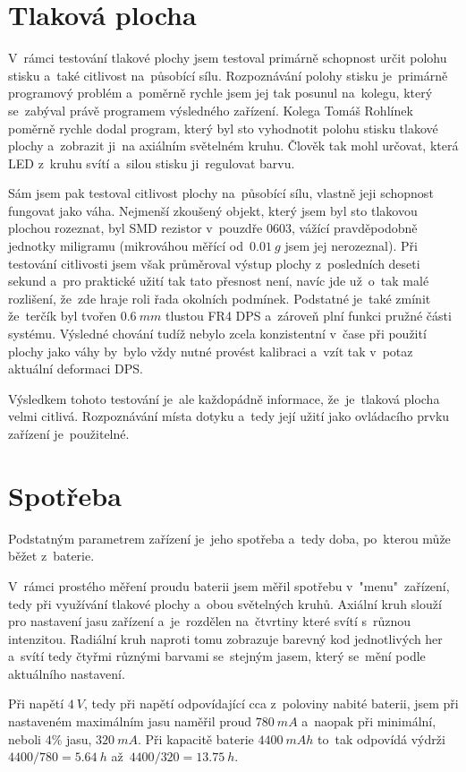 \section{Tlaková plocha \label{popisTlakovky3}}
V~rámci testování tlakové plochy jsem testoval primárně schopnost určit polohu stisku a~také citlivost na~působící sílu.
Rozpoznávání polohy stisku je~primárně programový problém a~poměrně rychle jsem jej tak posunul na~kolegu, který se~zabýval právě programem výsledného zařízení.
Kolega Tomáš Rohlínek poměrně rychle dodal program, který byl sto vyhodnotit polohu stisku tlakové plochy a~zobrazit ji~na axiálním světelném kruhu.
Člověk tak mohl určovat, která LED z~kruhu svítí a~silou stisku ji~regulovat barvu.

Sám jsem pak testoval citlivost plochy na~působící sílu, vlastně jeji schopnost fungovat jako váha.
Nejmenší zkoušený objekt, který jsem byl sto tlakovou plochou rozeznat, byl SMD rezistor v~pouzdře 0603, vážící pravděpodobně jednotky miligramu (mikrováhou měřící od~\(0.01~g\) jsem jej nerozeznal).
Při testování citlivosti jsem však průměroval výstup plochy z~posledních deseti sekund a~pro praktické užití tak tato přesnost není, navíc jde už~o~tak malé rozlišení, že~zde hraje roli řada okolních podmínek.
Podstatné je~také zmínit že~terčík byl tvořen \(0.6~mm\) tlustou FR4 DPS a~zároveň plní funkci pružné části systému.
Výsledné chování tudíž nebylo zcela konzistentní v~čase při použití plochy jako váhy by~bylo vždy nutné provést kalibraci a~vzít tak v~potaz aktuální deformaci DPS.

Výsledkem tohoto testování je~ale každopádně informace, že~je~tlaková plocha velmi citlivá.
Rozpoznávání místa dotyku a~tedy její užití jako ovládacího prvku zařízení je~použitelné.

\section{Spotřeba}
Podstatným parametrem zařízení je~jeho spotřeba a~tedy doba, po~kterou může běžet z~baterie.

V~rámci prostého měření proudu baterii jsem měřil spotřebu v~"menu"~zařízení, tedy při využívání tlakové plochy a~obou světelných kruhů.
Axiální kruh slouží pro nastavení jasu zařízení a~je~rozdělen na~čtvrtiny které svítí s~různou intenzitou.
Radiální kruh naproti tomu zobrazuje barevný kod jednotlivých her a~svítí tedy čtyřmi různými barvami se~stejným jasem, který se~mění podle aktuálního nastavení.

Při napětí \(4~V\), tedy při napětí odpovídající cca z~poloviny nabité baterii, jsem při nastaveném maximálním jasu naměřil proud \(780~mA\) a~naopak při minimální, neboli \(4 \%\) jasu, \(320~mA\). %
Při kapacitě baterie \(4400~mAh\) to~tak odpovídá výdrži \(4400/780 = 5.64~h\) až~\(4400/320 = 13.75~h\).
